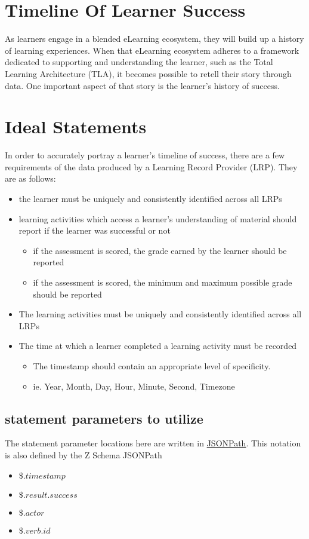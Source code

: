 \documentclass{article}
\begin{document}
\section*{Timeline Of Learner Success}
As learners engage in a blended eLearning ecosystem, they will build up a history of learning experiences. When that eLearning ecosystem adheres to a framework dedicated to supporting and understanding the learner, such as the Total Learning Architecture (TLA), it becomes possible to retell their story through data. One important aspect of that story is the learner's history of success.

\section{Ideal Statements}
In order to accurately portray a learner's timeline of success, there are a few requirements of the data produced by a Learning Record Provider (LRP). They are as follows:
\begin{itemize}
\item the learner must be uniquely and consistently identified across all LRPs
\item learning activities which access a learner's understanding of material should report if the learner was successful or not
  \begin{itemize}
  \item if the assessment is scored, the grade earned by the learner should be reported
  \item if the assessment is scored, the minimum and maximum possible grade should be reported
  \end{itemize}
\item The learning activities must be uniquely and consistently identified across all LRPs
\item The time at which a learner completed a learning activity must be recorded
  \begin{itemize}
  \item The timestamp should contain an appropriate level of specificity.
  \item ie. Year, Month, Day, Hour, Minute, Second, Timezone
  \end{itemize}
\end{itemize}

\subsection{statement parameters to utilize}
The statement parameter locations here are written in
\href{http://goessner.net/articles/JsonPath/}{JSONPath}. This notation
is also defined by the Z Schema JSONPath
\begin{itemize}
  \item $\$.timestamp$
  \item $\$.result.success$
  \item $\$.actor$
  \item $\$.verb.id$
  \end{itemize}
\end{document}
